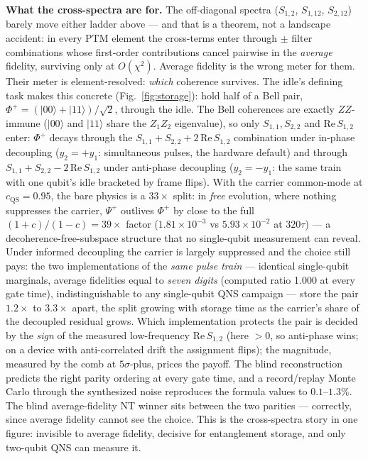 \documentclass[10pt]{article}
\begin{document}
\textbf{What the cross-spectra are for.} The off-diagonal spectra
($S_{1,2}$, $S_{1,12}$, $S_{2,12}$) barely move either ladder above --- and
that is a theorem, not a landscape accident: in every PTM element the
cross-terms enter through $\pm$ filter combinations whose first-order
contributions cancel pairwise in the \emph{average} fidelity, surviving
only at $O(\chi^2)$. Average fidelity is the wrong meter for them. Their
meter is element-resolved: \emph{which} coherence survives. The idle's
defining task makes this concrete (Fig.~\ref{fig:storage}): hold half of a
Bell pair, $\Phi^+ = (|00\rangle+|11\rangle)/\sqrt2$, through the idle. The
Bell coherences are exactly $ZZ$-immune ($|00\rangle$ and $|11\rangle$ share
the $Z_1Z_2$ eigenvalue), so only $S_{1,1}, S_{2,2}$ and
$\mathrm{Re}\,S_{1,2}$ enter: $\Phi^+$ decays through the
$S_{1,1}+S_{2,2}+2\,\mathrm{Re}\,S_{1,2}$ combination under in-phase
decoupling ($y_2 = +y_1$: simultaneous pulses, the hardware default) and
through $S_{1,1}+S_{2,2}-2\,\mathrm{Re}\,S_{1,2}$ under anti-phase
decoupling ($y_2 = -y_1$: the same train with one qubit's idle bracketed by
frame flips). With the carrier common-mode at $c_{\mathrm{QS}} = 0.95$, the bare physics
is a $33\times$ split: in \emph{free} evolution, where nothing suppresses
the carrier, $\Psi^+$ outlives $\Phi^+$ by close to the full
$(1+c)/(1-c) = 39\times$ factor ($1.81\times10^{-3}$ vs $5.93\times10^{-2}$ at $320\tau$) --- a
decoherence-free-subspace structure that no single-qubit measurement can
reveal. Under informed decoupling the carrier is largely suppressed and the
choice still pays: the two implementations of the \emph{same pulse train}
--- identical single-qubit marginals, average fidelities equal to
\emph{seven digits} (computed ratio 1.000 at every gate time),
indistinguishable to any single-qubit QNS campaign --- store the pair
$1.2\times$ to $3.3\times$ apart, the split growing with storage time as
the carrier's share of the decoupled residual grows. Which implementation
protects the pair is decided by the \emph{sign} of the measured
low-frequency $\mathrm{Re}\,S_{1,2}$ (here $>0$, so anti-phase wins; on a
device with anti-correlated drift the assignment flips); the magnitude,
measured by the comb at $5\sigma$-plus, prices the payoff. The blind
reconstruction predicts the right parity ordering at every gate time, and
a record/replay Monte Carlo through the synthesized noise reproduces the
formula values to $0.1$--$1.3\%$. The blind average-fidelity NT winner
sits between the two parities --- correctly, since average fidelity cannot
see the choice. This is the cross-spectra story in one figure: invisible
to average fidelity, decisive for entanglement storage, and only two-qubit
QNS can measure it.
\end{document}
